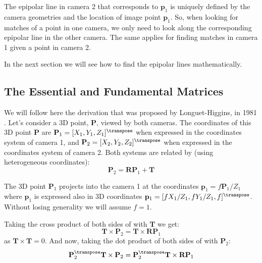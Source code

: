 The epipolar line in camera 2 that corresponds to $\mathbf{p}_1$ is uniquely defined by the camera geometries and the location of image point $\mathbf{p}_1$. So, when looking for matches of a point in one camera, we only need to look along the corresponding epipolar line in the other camera. The same applies for finding matches in camera 1 given a point in camera 2.

In the next section we will see how to find the epipolar lines  mathematically.


\subsection{The Essential and Fundamental Matrices}

We will follow here the derivation that was proposed by Longuet-Higgins, in 1981 \cite{Longuet-Higgens1981}.
Let's consider a 3D point, $\mathbf{P}$, viewed by both cameras. The coordinates of this 3D point $\mathbf{P}$ are $\mathbf{P}_1 = [X_1,Y_1,Z_1]^\transpose$ when expressed in the coordinates system of camera 1, and $\mathbf{P}_2= [X_2,Y_2,Z_2]^\transpose$ when expressed in the coordinates system of camera 2. Both systems are related by (using heterogeneous coordinates):
\begin{equation}
    \mathbf{P}_2 = \mathbf{R} \mathbf{P}_1 + \mathbf{T}
    \label{eq:relation1}
\end{equation}

The 3D point $\mathbf{P}_1$ projects into the camera 1 at the coordinates
$\mathbf{p}_1 = f \mathbf{P}_1 /Z_1$ where $\mathbf{p}_1$ is expressed also in 3D coordinates $\mathbf{p}_1 = [f X_1/Z_1, f Y_1/Z_1, f]^\transpose$. Without losing generality we will assume $f=1$.

Taking the cross product of both sides of \eqn{\ref{eq:relation1}} with $\mathbf{T}$ we get:
\begin{equation}
    \mathbf{T} \times \mathbf{P}_2 = \mathbf{T} \times \mathbf{R} \mathbf{P}_1
    \label{eq:relation2}
\end{equation}
as $\mathbf{T} \times \mathbf{T} = 0$. And now, taking the dot product of both sides of \eqn{\ref{eq:relation2}} with $\mathbf{P}_2$:
\begin{equation}
    \mathbf{P}_2^\transpose \mathbf{T} \times \mathbf{P}_2 = \mathbf{P}_2^\transpose \mathbf{T} \times \mathbf{R} \mathbf{P}_1
\end{equation}

